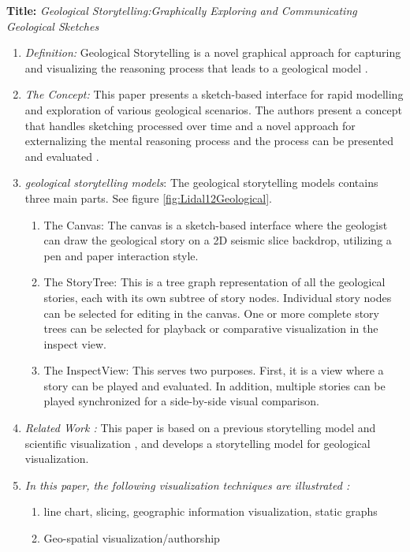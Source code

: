 \documentclass{egpubl}
\begin{document}
\textbf{Title:} \textit{Geological Storytelling:Graphically Exploring and Communicating Geological Sketches} 
\begin{enumerate}
\item \textit{Definition:} Geological Storytelling is a novel graphical approach for capturing and visualizing the reasoning process that leads to a geological model \cite{lidal} \cite{Lidal2013}.
\item \textit{The Concept:} This paper presents a sketch-based interface for rapid modelling and exploration of various geological scenarios. The authors present a concept that handles sketching processed over time and a novel approach for externalizing the mental reasoning process and the process can be presented and evaluated \cite{lidal}\cite{Lidal2013}.
\item \textit{geological storytelling models}:
The geological storytelling models contains three main parts. See figure \ref{fig:Lidal12Geological}.
\begin{enumerate}
\item The Canvas: The canvas is a sketch-based interface where the geologist can draw the geological story on a 2D seismic slice
backdrop, utilizing a pen and paper interaction style.
\item The StoryTree: This is a tree graph representation of all the geological stories, each with its own subtree of story nodes. Individual story nodes can be selected for editing in the canvas. One or more complete story trees can be selected for playback or comparative visualization in the inspect view.

\item The InspectView: This serves two purposes. First, it is a view where a story can be played and evaluated. In addition,
multiple stories can be played synchronized for a side-by-side visual comparison.

\end{enumerate}
\item \textit{Related Work :}  This paper is based on a previous storytelling model \cite{wohlfat} and scientific visualization \cite{sci}, and develops a storytelling model for geological visualization.
\item \textit{In this paper, the following visualization techniques are illustrated :} 
\begin{enumerate}
\item line chart, slicing, geographic information visualization, static graphs
\item Geo-spatial visualization/authorship
\end{enumerate}
\end{enumerate}
\end{document}
